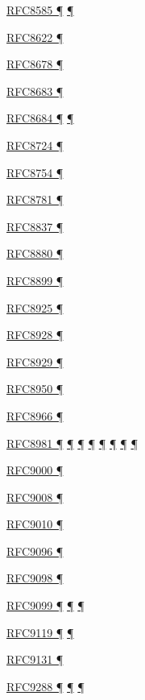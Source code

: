 \documentclass[
]{article}
\begin{document}
\hyperref[routing]{RFC8585 ¶} \hyperref[dual-stack-scenarios]{¶}

\hyperref[traffic-class-and-flow-label]{RFC8622 ¶}

\hyperref[multi-prefix-operation]{RFC8678 ¶}

\hyperref[translation-and-ipv4-as-a-service]{RFC8683 ¶}

\hyperref[transport-protocols]{RFC8684 ¶} \hyperref[multihoming]{¶}

\hyperref[energy-consumption]{RFC8724 ¶}

\hyperref[extension-headers-and-options]{RFC8754 ¶}

\hyperref[translation-and-ipv4-as-a-service]{RFC8781 ¶}

\hyperref[traffic-class-and-flow-label]{RFC8837 ¶}

\hyperref[translation-and-ipv4-as-a-service]{RFC8880 ¶}

\hyperref[extension-headers-and-options]{RFC8899 ¶}

\hyperref[dual-stack-scenarios]{RFC8925 ¶}

\hyperref[address-resolution]{RFC8928 ¶}

\hyperref[address-resolution]{RFC8929 ¶}

\hyperref[routing]{RFC8950 ¶}

\hyperref[routing]{RFC8966 ¶}

\hyperref[addresses]{RFC8981 ¶} \hyperref[auto-configuration]{¶}
\hyperref[layer-2-considerations]{¶} \hyperref[topology-obfuscation]{¶}
\hyperref[prefix-per-host]{¶}
\hyperref[address-and-prefix-management]{¶}
\hyperref[multi-prefix-operation]{¶} \hyperref[security-operation]{¶}

\hyperref[transport-protocols]{RFC9000 ¶}

\hyperref[routing]{RFC9008 ¶}

\hyperref[routing]{RFC9010 ¶}

\hyperref[routing]{RFC9096 ¶}

\hyperref[extension-headers-and-options]{RFC9098 ¶}

\hyperref[security]{RFC9099 ¶}
\hyperref[address-and-prefix-management]{¶}
\hyperref[security-operation]{¶}

\hyperref[address-resolution]{RFC9119 ¶} \hyperref[layer-2-functions]{¶}

\hyperref[address-resolution]{RFC9131 ¶}

\hyperref[extension-headers-and-options]{RFC9288 ¶}
\hyperref[filtering]{¶} \hyperref[security-operation]{¶}
\end{document}
